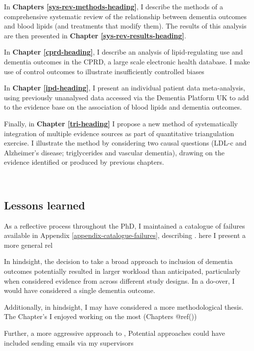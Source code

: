\documentclass[a4paper, twoside]{templates/ociamthesis}
\begin{document}
In \textbf{Chapters \ref{sys-rev-methods-heading}}, I describe the methods of a comprehensive systematic review of the relationship between dementia outcomes and blood lipids (and treatments that modify them). The results of this analysis are then presented in \textbf{Chapter \ref{sys-rev-results-heading}}.

In \textbf{Chapter \ref{cprd-heading}}, I describe an analysis of lipid-regulating use and dementia outcomes in the CPRD, a large scale electronic health database. I make use of control outcomes to illustrate insufficiently controlled biases

In \textbf{Chapter \ref{ipd-heading}}, I present an individual patient data meta-analysis, using previously unanalysed data accessed via the Dementia Platform UK to add to the evidence base on the association of blood lipids and dementia outcomes.

Finally, in \textbf{Chapter \ref{tri-heading}} I propose a new method of systematically integration of multiple evidence sources as part of quantitative triangulation exercise. I illustrate the method by considering two causal questions (LDL-c and Alzheimer's disease; triglycerides and vascular dementia), drawing on the evidence identified or produced by previous chapters.

~

\newpage

\hypertarget{lessons-learned}{%
\subsection{Lessons learned}\label{lessons-learned}}

As a reflective process throughout the PhD, I maintained a catalogue of failures available in Appendix \ref{appendix-catalogue-failures}, describing . here I present a more general rel

In hindsight, the decision to take a broad approach to inclusion of dementia outcomes potentially resulted in larger workload than anticipated, particularly when considered evidence from across different study designs. In a do-over, I would have considered a single dementia outcome.

Additionally, in hindsight, I may have considered a more methodological thesis. The Chapter's I enjoyed working on the most (Chapters @ref())

Further, a more aggressive approach to , Potential approaches could have included sending emails via my supervisors
\end{document}
